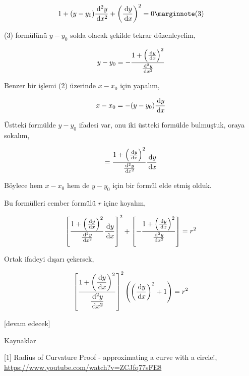\documentclass[12pt,fleqn]{article}\usepackage{../../common}
\begin{document}
$$
1 + (y-y_0) \frac{\ud^2y}{\ud x^2} +
\left( \frac{\ud y}{\ud x}  \right)^2 = 0
\mlabel{3}
$$

(3) formülünü $y-y_0$ solda olacak şekilde tekrar düzenleyelim,

$$
y-y_0 = - \frac{1 + \left( \frac{\,\mathrm{d} y}{\,\mathrm{d} x}  \right)^2}{\frac{\,\mathrm{d}^2y}{\,\mathrm{d} x^2}}
$$

Benzer bir işlemi (2) üzerinde $x-x_0$ için yapalım,

$$
x-x_0 = -(y-y_0)\frac{\,\mathrm{d} y}{\,\mathrm{d} x}
$$

Üstteki formülde $y-y_0$ ifadesi var, onu iki üstteki formülde bulmuştuk,
oraya sokalım,

$$
= \frac{1 + \left( \frac{\,\mathrm{d} y}{\,\mathrm{d} x}  \right)^2}{\frac{\,\mathrm{d}^2y}{\,\mathrm{d} x^2}}
\frac{\,\mathrm{d} y}{\,\mathrm{d} x}
$$

Böylece hem $x-x_0$ hem de $y-y_0$ için bir formül elde etmiş olduk.

Bu formülleri cember formülü $r$ içine koyalım,

$$
\left[
    \frac{1 + \left( \frac{\,\mathrm{d} y}{\,\mathrm{d} x}  \right)^2}
         {\frac{\,\mathrm{d}^2y}{\,\mathrm{d} x^2}} \frac{\,\mathrm{d} y}{\,\mathrm{d} x}
\right]^2
+
\left[
  - \frac{1 + \left( \frac{\,\mathrm{d} y}{\,\mathrm{d} x}  \right)^2}
         {\frac{\,\mathrm{d}^2y}{\,\mathrm{d} x^2}}
\right] = r^2
$$

Ortak ifadeyi dışarı çekersek,

$$
\left[
    \dfrac{1 + \left( \dfrac{\,\mathrm{d} y}{\,\mathrm{d} x}  \right)^2}
         {\dfrac{\,\mathrm{d}^2y}{\,\mathrm{d} x^2}}
\right]^2
\left(  \left(\dfrac{\,\mathrm{d} y}{\,\mathrm{d} x}  \right)^2 + 1 \right) = r^2
$$


[devam edecek]

Kaynaklar

[1] Radius of Curvature Proof - approximating a curve with a circle!,
    \url{https://www.youtube.com/watch?v=ZCJfq77sFE8}
\end{document}
